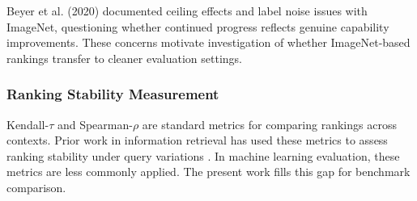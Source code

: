 Beyer et al. (2020) documented ceiling effects and label noise issues with ImageNet, questioning whether continued progress reflects genuine capability improvements. These concerns motivate investigation of whether ImageNet-based rankings transfer to cleaner evaluation settings.

\subsubsection{Ranking Stability Measurement}

Kendall-$\tau$ and Spearman-$\rho$ are standard metrics for comparing rankings across contexts. Prior work in information retrieval has used these metrics to assess ranking stability under query variations \citep{voorhees2000variations}. In machine learning evaluation, these metrics are less commonly applied. The present work fills this gap for benchmark comparison.

